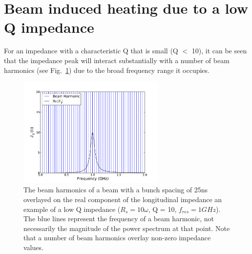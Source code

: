 \documentclass[12pt,a4paper,twopage,openright]{report}
\begin{document}

\section{Beam induced heating due to a low Q impedance}

For an impedance with a characteristic Q that is small (Q $<$ 10), it can be seen that the impedance peak will interact substantially with a number of beam harmonics (see Fig.~\ref{fig:low_q_harmonics}) due to the broad frequency range it occupies.

\begin{figure}
\begin{center}
\includegraphics[width=0.65\textwidth]{figures/low_q_10_resonance_beam_harmonics.pdf}
\end{center}
\label{fig:low_q_harmonics}
\caption{The beam harmonics of a beam with a bunch spacing of 25ns overlayed on the real component of the longitudinal impedance an example of a low Q impedance ($R_{s}=10\omega$, Q = 10, $f_{res}=1GHz$). The blue lines represent the frequency of a beam harmonic, not necessarily the magnitude of the power spectrum at that point. Note that a number of beam harmonics overlay non-zero impedance values.}
\end{figure}
\end{document}
